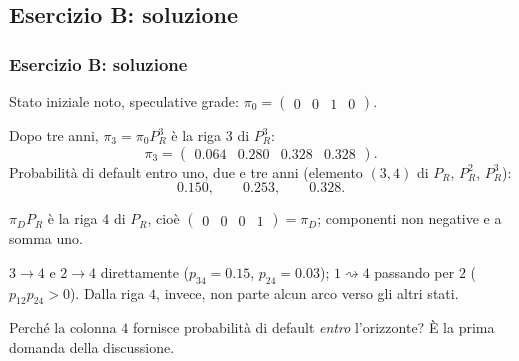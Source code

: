



\subsection{Esercizio B: soluzione}%

\begin{frame}%
%

\frametitle{Esercizio B: soluzione}%
%

%


\begin{stepenumerate}


\item[1.] Stato iniziale noto, speculative grade: $\pi_{0}=
\begin{pmatrix}
0 & 0 & 1 & 0
\end{pmatrix}
$.

\item[2.] Dopo tre anni, $\pi_{3}=\pi_{0}P_{R}^{3}$ \`{e} la riga $3$ di
$P_{R}^{3}$:
\[
\pi_{3}=
\begin{pmatrix}
0.064 & 0.280 & 0.328 & 0.328
\end{pmatrix}
.
\]
Probabilit\`{a} di default entro uno, due e tre anni (elemento $(3,4)$ di
$P_{R}$, $P_{R}^{2}$, $P_{R}^{3}$):
\[
0.150, \qquad0.253, \qquad0.328.
\]


\item[3.] $\pi_{D}P_{R}$ \`{e} la riga $4$ di $P_{R}$, cio\`{e} $%
\begin{pmatrix}
0 & 0 & 0 & 1
\end{pmatrix}
=\pi_{D}$; componenti non negative e a somma uno.

\item[4.] $3\rightarrow4$ e $2\rightarrow4$ direttamente ($p_{34}=0.15$,
$p_{24}=0.03$); $1\rightsquigarrow4$ passando per $2$ ($p_{12}p_{24}>0$).
Dalla riga $4$, invece, non parte alcun arco verso gli altri stati.
\end{stepenumerate}

\medskip

\begin{center}
{\small Perch\'{e} la colonna $4$ fornisce probabilit\`{a} di default
\emph{entro} l'orizzonte? \`{E} la prima domanda della discussione.}
\end{center}%

\transboxout
\end{frame}%



